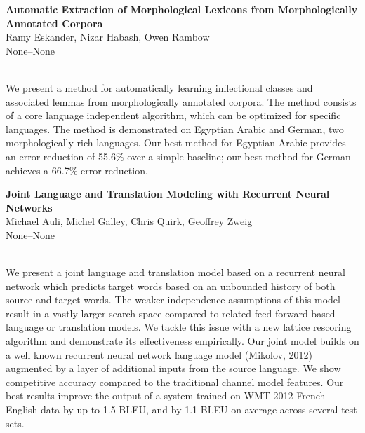 \documentclass[twoside,makeidx]{book}
\begin{document}
\par\vspace{2em}\noindent%
\begin{minipage}{\linewidth}%
\begin{center}
\textbf{\normalsize Automatic Extraction of Morphological Lexicons from Morphologically Annotated Corpora}\\
\normalsize  Ramy Eskander,  Nizar Habash,  Owen Rambow\\
{\small None--None}\\
\end{center}
\end{minipage}\\[0.5em]
\nopagebreak%
\noindent%
{\small We present a method for automatically learning inflectional classes and associated lemmas from morphologically annotated corpora. The method consists of a core language independent algorithm, which can be optimized for specific languages. The method is demonstrated on Egyptian Arabic and German, two morphologically rich languages. Our best method for Egyptian Arabic provides an error reduction of 55.6\% over a simple baseline; our best method for German achieves a 66.7\% error reduction.}
\par\vspace{2em}\noindent%
\begin{minipage}{\linewidth}%
\begin{center}
\textbf{\normalsize Joint Language and Translation Modeling with Recurrent Neural Networks}\\
\normalsize  Michael Auli,  Michel Galley,  Chris Quirk,  Geoffrey Zweig\\
{\small None--None}\\
\end{center}
\end{minipage}\\[0.5em]
\nopagebreak%
\noindent%
{\small We present a joint language and translation model based on a recurrent neural network which predicts target words based on an unbounded history of both source and target words. The weaker independence assumptions of this model result in a vastly larger search space compared to related feed-forward-based language or translation models. We tackle this issue with a new lattice rescoring algorithm and demonstrate its effectiveness empirically. Our joint model builds on a well known recurrent neural network language model (Mikolov, 2012) augmented by a layer of additional inputs from the source language. We show competitive accuracy compared to the traditional channel model features. Our best results improve the output of a system trained on WMT 2012 French-English data by up to 1.5 BLEU, and by 1.1 BLEU on average across several test sets.}
\end{document}
